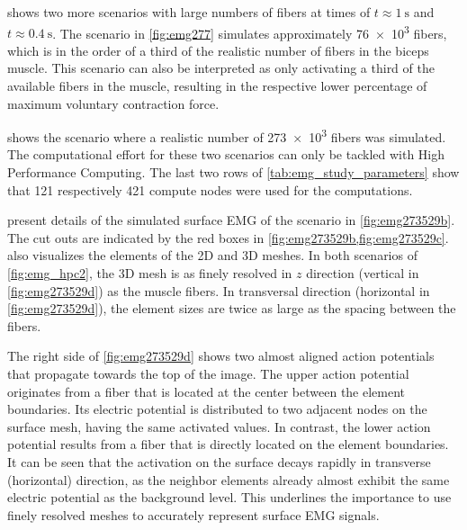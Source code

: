  shows two more scenarios with large numbers of fibers at times of $t\approx \SI{1}{\s}$ and $t\approx \SI{0.4}{\s}$. The scenario in \cref{fig:emg277} simulates approximately \num{76e3} fibers, which is in the order of a third of the realistic number of fibers in the biceps muscle. 
This scenario can also be interpreted as only activating a third of the available fibers in the muscle, resulting in the respective lower percentage of maximum voluntary contraction force.

 shows the scenario where a realistic number of \num{273e3} fibers was simulated. The computational effort for these two scenarios can only be tackled with High Performance Computing. The last two rows of \cref{tab:emg_study_parameters} show that 121 respectively 421 compute nodes were used for the computations.

 present details of the simulated surface EMG of the scenario in \cref{fig:emg273529b}. The cut outs are indicated by the red boxes in \cref{fig:emg273529b,fig:emg273529c}.  also visualizes the elements of the 2D and 3D meshes. In both scenarios of \cref{fig:emg_hpc2}, the 3D mesh is as finely resolved in $z$ direction (vertical in \cref{fig:emg273529d}) as the muscle fibers. In transversal direction (horizontal in \cref{fig:emg273529d}), the element sizes are twice as large as the spacing between the fibers. 

The right side of \cref{fig:emg273529d} shows two almost aligned action potentials that propagate towards the top of the image. The upper action potential originates from a fiber that is located at the center between the element boundaries. Its electric potential is distributed to two adjacent nodes on the surface mesh, having the same activated values.
In contrast, the lower action potential results from a fiber that is directly located on the element boundaries. It can be seen that the activation on the surface decays rapidly in transverse (horizontal) direction, as the neighbor elements already almost exhibit the same electric potential as the background level. This underlines the importance to use finely resolved meshes to accurately represent surface EMG signals.


